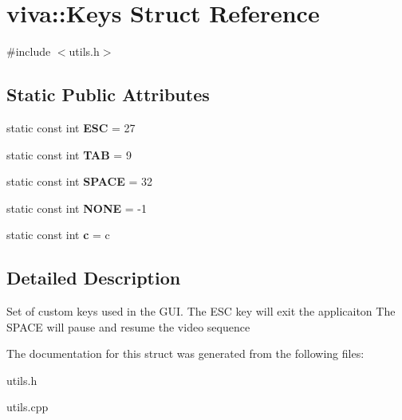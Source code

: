 \hypertarget{structviva_1_1_keys}{}\section{viva\+:\+:Keys Struct Reference}
\label{structviva_1_1_keys}


{\ttfamily \#include $<$utils.\+h$>$}

\subsection*{Static Public Attributes}
\begin{DoxyCompactItemize}
\item 
static const int {\bfseries E\+SC} = 27\hypertarget{structviva_1_1_keys_ac6523bc0746965636ffdc68d3f436a23}{}\label{structviva_1_1_keys_ac6523bc0746965636ffdc68d3f436a23}

\item 
static const int {\bfseries T\+AB} = 9\hypertarget{structviva_1_1_keys_a6e7ea2431a204ae4bf423e991304b560}{}\label{structviva_1_1_keys_a6e7ea2431a204ae4bf423e991304b560}

\item 
static const int {\bfseries S\+P\+A\+CE} = 32\hypertarget{structviva_1_1_keys_a002c97e8fff639c0fd8b6aa26bc89d35}{}\label{structviva_1_1_keys_a002c97e8fff639c0fd8b6aa26bc89d35}

\item 
static const int {\bfseries N\+O\+NE} = -\/1\hypertarget{structviva_1_1_keys_a28978a62c674741157417b5261eb7984}{}\label{structviva_1_1_keys_a28978a62c674741157417b5261eb7984}

\item 
static const int {\bfseries c} = \textquotesingle{}c\textquotesingle{}\hypertarget{structviva_1_1_keys_a54cb8ed20e50156e2ca257163ccf97de}{}\label{structviva_1_1_keys_a54cb8ed20e50156e2ca257163ccf97de}

\end{DoxyCompactItemize}


\subsection{Detailed Description}
Set of custom keys used in the G\+UI. The E\+SC key will exit the applicaiton The S\+P\+A\+CE will pause and resume the video sequence 

The documentation for this struct was generated from the following files\+:\begin{DoxyCompactItemize}
\item 
utils.\+h\item 
utils.\+cpp\end{DoxyCompactItemize}
